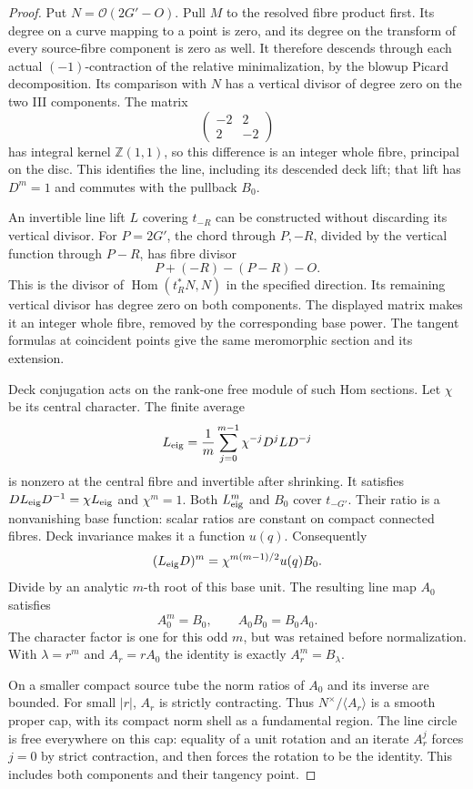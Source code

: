 \begin{proof}
Put $N=\mathcal O(2G'-O)$. Pull $M$ to the resolved fibre
product first. Its degree on a curve mapping to a point is zero,
and its degree on the transform of every source-fibre component
is zero as well. It therefore descends through each actual
$(-1)$-contraction of the relative minimalization, by the blowup
Picard decomposition. Its comparison with $N$ has a vertical
divisor of degree zero on the two III components. The matrix
\[
                    \begin{pmatrix}-2&2\\2&-2\end{pmatrix}
\]
has integral kernel $\mathbb Z(1,1)$, so this difference is an
integer whole fibre, principal on the disc. This identifies the
line, including its descended deck lift; that lift has $D^m=1$
and commutes with the pullback $B_0$.

An invertible line lift $L$ covering $t_{-R}$ can be constructed
without discarding its vertical divisor. For $P=2G'$, the chord
through $P,-R$, divided by the vertical function through $P-R$,
has fibre divisor
\[
                        P+(-R)-(P-R)-O.
\]
This is the divisor of $\operatorname{Hom}(t_R^*N,N)$ in the
specified direction. Its remaining vertical divisor has degree
zero on both components. The displayed matrix makes it an
integer whole fibre, removed by the corresponding base power.
The tangent formulas at coincident points give the same
meromorphic section and its extension.

Deck conjugation acts on the rank-one free module of such Hom
sections. Let $\chi$ be its central character. The finite average
\[
 L_{\rm eig}=\frac1m\sum_{j=0}^{m-1}
                 \chi^{-j}D^jLD^{-j}
\]
is nonzero at the central fibre and invertible after shrinking.
It satisfies $DL_{\rm eig}D^{-1}=\chi L_{\rm eig}$ and
$\chi^m=1$. Both $L_{\rm eig}^m$ and $B_0$ cover $t_{-G'}$.
Their ratio is a nonvanishing base function: scalar ratios are
constant on compact connected fibres. Deck invariance makes it
a function $u(q)$. Consequently
\[
 (L_{\rm eig}D)^m=\chi^{m(m-1)/2}u(q)B_0.
\]
Divide by an analytic $m$-th root of this base unit. The resulting
line map $A_0$ satisfies
\[
                   A_0^m=B_0,\qquad A_0B_0=B_0A_0.     \tag{F37.3}
\]
The character factor is one for this odd $m$, but was retained
before normalization. With $\lambda=r^m$ and $A_r=rA_0$ the
identity is exactly $A_r^m=B_\lambda$.

On a smaller compact source tube the norm ratios of $A_0$ and
its inverse are bounded. For small $|r|$, $A_r$ is strictly
contracting. Thus $N^\times/\langle A_r\rangle$ is a smooth
proper cap, with its compact norm shell as a fundamental region.
The line circle is free everywhere on this cap: equality of a
unit rotation and an iterate $A_r^j$ forces $j=0$ by strict
contraction, and then forces the rotation to be the identity.
This includes both components and their tangency point.


\end{proof}
